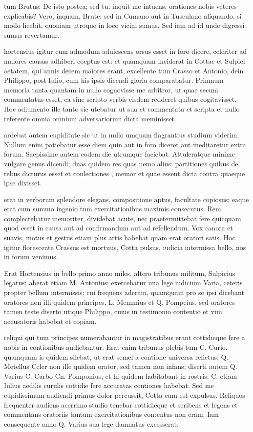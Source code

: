  tum Brutus: De isto postea; sed tu, inquit me intuens, orationes nobis veteres explicabis? Vero, inquam, Brute; sed in Cumano aut in Tusculano aliquando, si modo licebit, quoniam utroque in loco vicini sumus. Sed iam ad id unde digressi sumus revertamur.

 hortensius igitur cum admodum adulescens orsus esset in foro dicere, celeriter ad maiores causas adhiberi coeptus est: et quamquam inciderat in Cottae et Sulpici aetatem, qui annis decem maiores erant, excellente tum Crasso et Antonio, dein Philippo, post Iulio, cum his ipsis dicendi gloria comparabatur. Primnum memoria tanta quantam in nullo cognovisse me arbitror, ut quae secum commentatus esset, ea sine scripto verbis eisdem redderet quibus cogitavisset. Hoc adiumento ille tanto sic utebatur ut sua et commentata et scripta et nullo referente omnia omnium adversariorum dicta meminisset.

 ardebat autem cupiditate sic ut in nullo umquam flagrantius studium viderim. Nullum enim patiebatur esse diem quin aut in foro diceret aut meditaretur extra forum. Saepissime autem eodem die utrumque faciebat. Attuleratque minime vulgare genus dicendi; duas quidem res quas nemo alius: partitiones quibus de rebus dicturus esset et conlectiones , memor et quae essent dicta contra quaeque ipse dixisset.

 erat in verborum splendore elegans, compositione aptus, facultate copiosus; eaque erat cum summo ingenio tum exercitationibus maximis consecutus. Rem complectebatur memoriter, dividebat acute, nec praetermittebat fere quicquam quod esset in causa aut ad confirmandum aut ad refellendum. Vox canora et suavis, motus et gestus etiam plus artis habebat quam erat oratori satis. Hoc igitur florescente Crassus est mortuus, Cotta pulsus, iudicia intermissa bello, nos in forum venimus.

 Erat Hortensius in bello primo anno miles, altero tribunus militum, Sulpicius legatus; aberat etiam M. Antonius; exercebatur una lege iudicium Varia, ceteris propter bellum intermissis; cui frequens aderam, quamquam pro se ipsi dicebant oratores non illi quidem principes, L. Memmius et Q. Pompeius, sed oratores tamen teste diserto utique Philippo, cuius in testimonio contentio et vim accusatoris habebat et copiam.

 reliqui qui tum principes numerabantur in magistratibus erant cottidieque fere a nobis in contionibus audiebantur. Erat enim tribunus plebis tum C. Curio, quamquam is quidem silebat, ut erat semel a contione universa relictus; Q. Metellus Celer non ille quidem orator, sed tamen non infans; diserti autem Q. Varius C. Carbo Cn. Pomponius, et hi quidem habitabant in rostris; C. etiam Iulius aedilis curulis cottidie fere accuratas contiones habebat. Sed me cupidissimum audiendi primus dolor percussit, Cotta cum est expulsus. Reliquos frequenter audiens acerrimo studio tenebar cottidieque et scribens et legens et commentans oratoriis tantum exercitationibus contentus non eram. Iam consequente anno Q. Varius sua lege damnatus excesserat;

